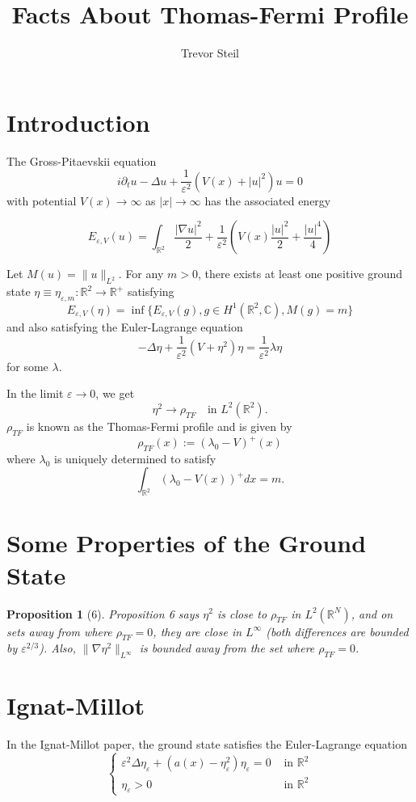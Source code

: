 \documentclass[a4paper]{article}
\title{Facts About Thomas-Fermi Profile }
\date{}
\author{Trevor Steil}
\newtheorem{proposition}{Proposition}[section]
\newcommand{\R}{\mathbb{R}}
\newcommand{\C}{\mathbb{C}}
\begin{document}
\maketitle

\section{Introduction}

The Gross-Pitaevskii equation
\begin{equation}
  i \partial_t u - \Delta u + \frac{1}{\varepsilon^2} ( V(x) + |u|^2 ) u = 0
  \label{eqn:GP}
\end{equation}
with potential $V(x) \to \infty$ as $|x| \to \infty$ has the associated energy

\begin{equation}
  E_{\varepsilon, V} (u) = \int_{\R^2}^{} \frac{| \nabla u|^2}{2} + \frac{1}{\varepsilon^2} \left( V(x) \frac{|u|^2}{2} + \frac{|u|^4}{4} \right)
  \label{eqn:energy_functional}
\end{equation}

Let $M(u) = \|u\|_{L^2}$. For any $m>0$, there exists at least one positive ground state $\eta \equiv \eta_{\varepsilon, m} : \R^2 \to \R^+$
satisfying
\begin{equation}
  E_{\varepsilon, V}(\eta) = \inf \{ E_{\varepsilon, V}(g), g \in H^1( \R^2, \C), M(g) = m \}
  \label{eqn:ground_state_min}
\end{equation}
and also satisfying the Euler-Lagrange equation
\begin{equation}
  -\Delta \eta + \frac{1}{\varepsilon^2} ( V + \eta^2 ) \eta = \frac{1}{\varepsilon^2} \lambda \eta
  \label{eqn:ground_state_Euler_Lagrange}
\end{equation}
for some $\lambda$.

In the limit $\varepsilon \to 0$, we get
\[ \eta^2 \to \rho_{TF} \quad \text{in } L^2(\R^2) .\]
$\rho_{TF}$ is known as the Thomas-Fermi profile and is given by
\[ \rho_{TF}(x) := (\lambda_0 - V)^+(x) \]
where $\lambda_0$ is uniquely determined to satisfy
\[ \int_{\R^2}^{} (\lambda_0 - V(x))^+ dx = m .\]

\section{Some Properties of the Ground State}

\begin{proposition}[6] Proposition 6 says $\eta^2$ is close to $\rho_{TF}$ in $L^2(\R^N)$, and on sets away from where $\rho_{TF} = 0$, they are close in $L^\infty$ (both
differences are bounded by $\varepsilon^{2/3}$). Also, $\| \nabla \eta^2 \|_{L^\infty}$ is bounded away from the set where $\rho_{TF}=0$.
\end{proposition}

\section{Ignat-Millot}
In the Ignat-Millot paper, the ground state satisfies the Euler-Lagrange equation
\[ \begin{cases}
    \varepsilon^2 \Delta \eta_\varepsilon + (a(x) - \eta_\varepsilon^2) \eta_\varepsilon = 0 &\text{ in } \R^2 \\
    \eta_\varepsilon > 0 &\text{ in } \R^2
\end{cases} \]
\end{document}
